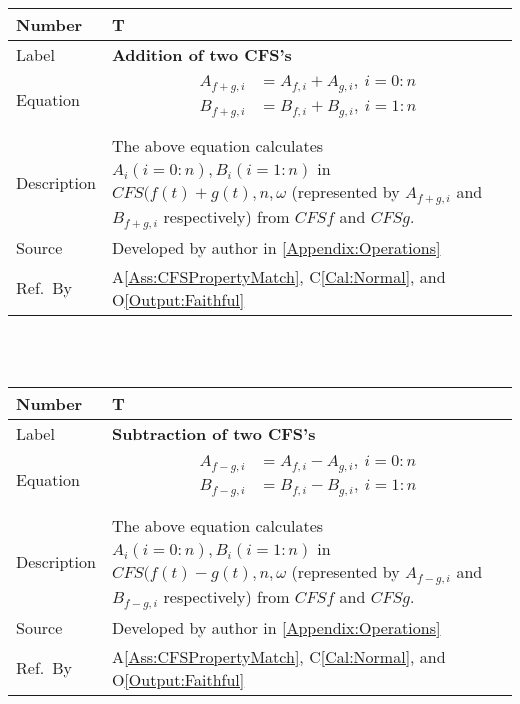 \documentclass[12pt]{article}
\newcommand{\colAwidth}{0.13\textwidth}
\newcommand{\colBwidth}{0.82\textwidth}
\newcounter{theorynum} %
\newcommand{\aref}[1]{A\ref{#1}}
\newcommand{\calref}[1]{C\ref{#1}}
\newcommand{\oref}[1]{O\ref{#1}}
\begin{document}
~\newline
\noindent
\begin{minipage}{\textwidth}
	\renewcommand*{\arraystretch}{1.5}
	\begin{tabular}{| p{\colAwidth} | p{\colBwidth}|}
		\hline
		\rowcolor[gray]{0.9}
		Number& T{theorynum}\thetheorynum \label{T:Addition}\\
		\hline
		Label&\bf Addition of two CFS's\\
		\hline
		Equation&  
		\begin{equation}
		\begin{aligned}
		A_{f+g, i}
		&=A_{f, i} + A_{g, i},~i=0:n\\
		B_{f+g, i}
		&=B_{f, i} + B_{g, i},~i=1:n\\
		\end{aligned}
		\end{equation}\\
		\hline
		Description & The above equation calculates $A_i (i=0:n), B_i(i=1:n)$ in $\mathit{CFS(f(t)+g(t), n, \omega}$ (represented by $A_{f+g, i}$ and $B_{f+g, i}$ respectively) from $\mathit{CFSf}$ and $\mathit{CFSg}$.\\
		
		\hline
		Source & Developed by author in \autoref{Appendix:Operations}\\
		\hline
		Ref.\ By & \aref{Ass:CFSPropertyMatch}, \calref{Cal:Normal}, and \oref{Output:Faithful}\\
		\hline
	\end{tabular}
\end{minipage}\\
~\newline
\noindent
\begin{minipage}{\textwidth}
	\renewcommand*{\arraystretch}{1.5}
	\begin{tabular}{| p{\colAwidth} | p{\colBwidth}|}
		\hline
		\rowcolor[gray]{0.9}
		Number& T{theorynum}\thetheorynum \label{T:Subtraction}\\
		\hline
		Label&\bf Subtraction of two CFS's\\
		\hline
		Equation&  
		\begin{equation}
		\begin{aligned}
		A_{f-g, i}
		&=A_{f, i} - A_{g, i},~i=0:n\\
		B_{f-g, i}
		&=B_{f, i} - B_{g, i},~i=1:n\\
		\end{aligned}
		\end{equation}\\
		\hline
		Description & The above equation calculates $A_i (i=0:n), B_i(i=1:n)$ in $\mathit{CFS(f(t)-g(t), n, \omega} $ (represented by $A_{f-g, i}$ and $B_{f-g, i}$ respectively) from $\mathit{CFSf}$ and $\mathit{CFSg}$.\\
		
		\hline
		Source & Developed by author in \autoref{Appendix:Operations}\\
		\hline
		Ref.\ By & \aref{Ass:CFSPropertyMatch}, \calref{Cal:Normal}, and \oref{Output:Faithful}\\
		\hline
	\end{tabular}
\end{minipage}\\
\end{document}
